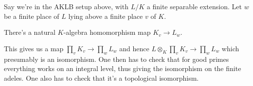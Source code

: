 Say we're in the AKLB setup above, with $L/K$ a finite separable extension.
Let $w$ be a finite place of $L$ lying above a finite place $v$ of $K$.

\begin{definition}
  \label{IsDedekindDomain.HeightOneSpectrum.adicCompletion_alg_comap}
  There's a natural $K$-algebra homomorphism map $K_v\to L_w$.
\end{definition}

This gives us a map $\prod_v K_v\to\prod_w L_w$
and hence $L\otimes_K\prod_v K_v\to\prod_w L_w$ which presumably is an isomorphism.
One then has to check that for good primes everything works on an integral level,
thus giving the isomorphism on the finite adeles. One also has to check that it's a
topological isomorphism.
